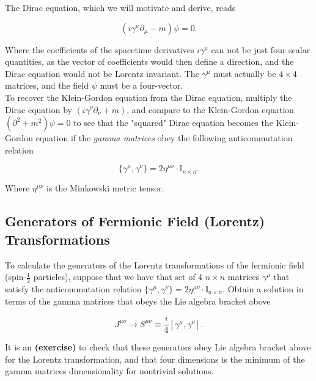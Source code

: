 \noindent The Dirac equation, which we will motivate and derive, reads

\begin{equation}
(i \gamma^\mu \partial_\mu - m) \psi = 0 .
\end{equation}

\noindent Where the coefficients of the spacetime derivatives $i\gamma^\mu$ can not be just four scalar quantities, as the vector of coefficients would then define a direction, and the Dirac equation would not be Lorentz invariant. The $\gamma^\mu$ must actually be $4\times 4$ matrices, and the field $\psi$ must be a four-vector. \\

\noindent To recover the Klein-Gordon equation from the Dirac equation, multiply the Dirac equation by $(i \gamma^\nu \partial_\nu + m)$, and compare to the Klein-Gordon equation $(\partial^2 + m^2)\psi=0$ to see that the "squared" Dirac equation becomes the Klein-Gordon equation if the \textit{gamma matrices} obey the following anticommutation relation

\begin{equation}
\{ \gamma^\mu, \gamma^\nu \} = 2 \eta^{\mu\nu} \cdot \mathbb{I}_{n \times n}.
\end{equation}

\noindent Where $\eta^{\mu\nu}$ is the Minkowski metric tensor.

\subsection*{Generators of Fermionic Field (Lorentz) Transformations}

\noindent To calculate the generators of the Lorentz transformations of the fermionic field (spin-$\frac{1}{2}$ particles), suppose that we have that set of 4 $n \times n$ matrices $\gamma^\mu$ that satisfy the anticommutation relation $\{ \gamma^\mu, \gamma^\nu \} = 2 \eta^{\mu\nu} \cdot \mathbb{I}_{n \times n}$. Obtain a solution in terms of the gamma matrices that obeys the Lie algebra bracket above

\begin{equation}
J^{\mu\nu} \to S^{\mu\nu} \equiv \frac{i}{4} [\gamma^\mu, \gamma^\nu].
\end{equation}

\noindent It is an \textbf{(exercise)} to check that these generators obey Lie algebra bracket above for the Lorentz transformation, and that four dimensions is the minimum of the gamma matrices dimensionality for nontrivial solutions. \\

